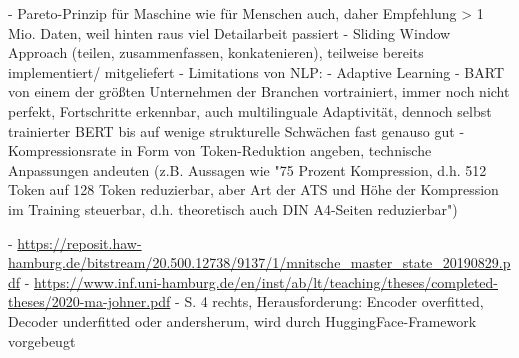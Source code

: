 - Pareto-Prinzip für Maschine wie für Menschen auch, daher Empfehlung > 1 Mio. Daten, weil hinten raus viel Detailarbeit passiert
- Sliding Window Approach (teilen, zusammenfassen, konkatenieren), teilweise bereits implementiert/ mitgeliefert
- Limitations von NLP: \cite[S.~30-31]{BIR09}
- Adaptive Learning
- BART von einem der größten Unternehmen der Branchen vortrainiert, immer noch nicht perfekt, Fortschritte erkennbar, auch multilinguale Adaptivität, dennoch selbst trainierter BERT bis auf wenige strukturelle Schwächen fast genauso gut
- Kompressionsrate in Form von Token-Reduktion angeben, technische Anpassungen andeuten (z.B. Aussagen wie "75 Prozent Kompression, d.h. 512 Token auf 128 Token reduzierbar, aber Art der ATS und Höhe der Kompression im Training steuerbar, d.h. theoretisch auch DIN A4-Seiten reduzierbar")

- \url{https://reposit.haw-hamburg.de/bitstream/20.500.12738/9137/1/mnitsche_master_state_20190829.pdf}
- \url{https://www.inf.uni-hamburg.de/en/inst/ab/lt/teaching/theses/completed-theses/2020-ma-johner.pdf}
- \cite{YAN19} S. 4 rechts, Herausforderung: Encoder overfitted, Decoder underfitted oder andersherum, wird durch HuggingFace-Framework vorgebeugt
